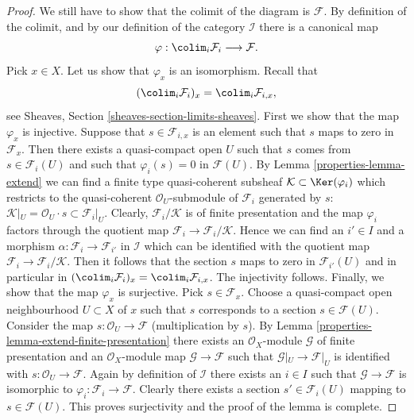 \begin{proof}
\medskip\noindent
We still have to show that the colimit of the diagram is $\mathcal{F}$.
By definition of the colimit, and by our definition of the category
$\mathcal{I}$ there is a canonical map
$$
\varphi :
\colim_i \mathcal{F}_i
\longrightarrow
\mathcal{F}.
$$
Pick $x \in X$. Let us show that $\varphi_x$ is an isomorphism.
Recall that
$$
(\colim_i \mathcal{F}_i)_x
=
\colim_i \mathcal{F}_{i, x},
$$
see
Sheaves, Section \ref{sheaves-section-limits-sheaves}.
First we show that the map $\varphi_x$ is injective.
Suppose that $s \in \mathcal{F}_{i, x}$ is an element
such that $s$ maps to zero in $\mathcal{F}_x$. Then there exists
a quasi-compact open $U$ such that $s$ comes from $s \in \mathcal{F}_i(U)$
and such that $\varphi_i(s) = 0$ in $\mathcal{F}(U)$.
By Lemma \ref{properties-lemma-extend}
we can find a finite type quasi-coherent subsheaf
$\mathcal{K} \subset \Ker(\varphi_i)$ which restricts to
the quasi-coherent $\mathcal{O}_U$-submodule of $\mathcal{F}_i$
generated by $s$:
$\mathcal{K}|_U = \mathcal{O}_U\cdot s \subset \mathcal{F}_i|_U$.
Clearly, $\mathcal{F}_i/\mathcal{K}$ is of finite presentation and
the map $\varphi_i$ factors through the quotient map
$\mathcal{F}_i \to \mathcal{F}_i/\mathcal{K}$. Hence we can find
an $i' \in I$ and a morphism $\alpha : \mathcal{F}_i \to \mathcal{F}_{i'}$
in $\mathcal{I}$ which can be identified with the quotient map
$\mathcal{F}_i \to \mathcal{F}_i/\mathcal{K}$. Then it follows
that the section $s$ maps to zero in $\mathcal{F}_{i'}(U)$ and
in particular in
$(\colim_i \mathcal{F}_i)_x =
\colim_i \mathcal{F}_{i, x}$.
The injectivity follows.
Finally, we show that the map $\varphi_x$ is surjective.
Pick $s \in \mathcal{F}_x$. Choose a quasi-compact open neighbourhood
$U \subset X$ of $x$ such that $s$ corresponds to a section
$s \in \mathcal{F}(U)$. Consider the map
$s : \mathcal{O}_U \to \mathcal{F}$ (multiplication by $s$).
By Lemma \ref{properties-lemma-extend-finite-presentation}
there exists an $\mathcal{O}_X$-module $\mathcal{G}$
of finite presentation and an $\mathcal{O}_X$-module map
$\mathcal{G} \to \mathcal{F}$ such that $\mathcal{G}|_U \to \mathcal{F}|_U$
is identified with
$s : \mathcal{O}_U \to \mathcal{F}$.
Again by definition of $\mathcal{I}$ there exists an $i \in I$
such that $\mathcal{G} \to \mathcal{F}$ is isomorphic to
$\varphi_i : \mathcal{F}_i \to \mathcal{F}$. Clearly there exists
a section $s' \in \mathcal{F}_i(U)$ mapping to $s \in \mathcal{F}(U)$.
This proves surjectivity and the proof of the lemma is complete.
\end{proof}

